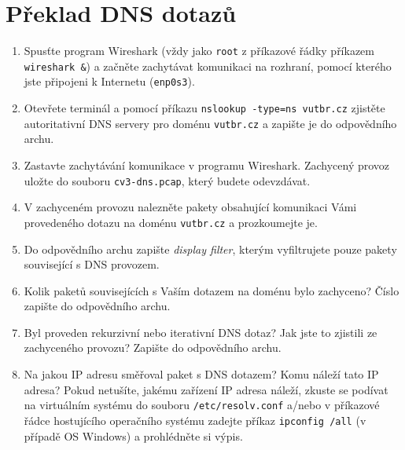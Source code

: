 \section{Překlad DNS dotazů}
\begin{enumerate}
    \item Spusťte program Wireshark (vždy jako \texttt{root} z příkazové řádky příkazem \texttt{wireshark \&}) a začněte zachytávat komunikaci na rozhraní, pomocí kterého jste připojeni k Internetu (\texttt{enp0s3}).
    \item Otevřete terminál a pomocí příkazu \texttt{nslookup -type=ns vutbr.cz} zjistěte autoritativní DNS servery pro doménu \texttt{vutbr.cz} a zapište je do odpovědního archu.
    \item Zastavte zachytávání komunikace v programu Wireshark. Zachycený provoz uložte do souboru \texttt{cv3-dns.pcap}, který budete odevzdávat.
    \item V zachyceném provozu nalezněte pakety obsahující komunikaci Vámi provedeného dotazu na doménu \texttt{vutbr.cz} a prozkoumejte je.
	\item Do odpovědního archu zapište \emph{display filter}, kterým vyfiltrujete pouze pakety související s DNS provozem.
	\item Kolik paketů souvisejících s Vaším dotazem na doménu bylo zachyceno? Číslo zapište do odpovědního archu.
	\item Byl proveden rekurzivní nebo iterativní DNS dotaz? Jak jste to zjistili ze zachyceného provozu? Zapište do odpovědního archu.
	\item Na jakou IP adresu směřoval paket s DNS dotazem? Komu náleží tato IP adresa? Pokud netušíte, jakému zařízení IP adresa náleží, zkuste se podívat na virtuálním systému do souboru \texttt{/etc/resolv.conf} a/nebo v příkazové řádce hostujícího operačního systému zadejte příkaz \texttt{ipconfig /all} (v případě OS Windows) a prohlédněte si výpis.
\end{enumerate}

